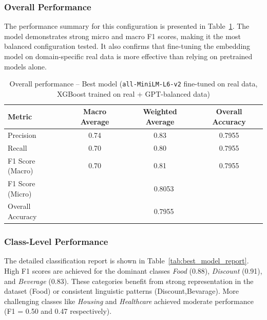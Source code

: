 \documentclass{SGGW-thesis-EN}
\begin{document}
\subsubsection*{Overall Performance}

The performance summary for this configuration is presented in Table~\ref{tab:best_model_summary}. The model demonstrates strong micro and macro  
F1 scores, making it the most balanced configuration tested. It also confirms that fine-tuning the embedding model on domain-specific real data  
is more effective than relying on pretrained models alone.

\begin{table}[h!]
  \centering
  \caption{Overall performance – Best model (\texttt{all-MiniLM-L6-v2} fine-tuned on real data, XGBoost trained on real + GPT-balanced data)}
  \label{tab:best_model_summary}
  \begin{tabularx}{\textwidth}{lccc}
    \toprule
    \textbf{Metric}         & \textbf{Macro Average} & \textbf{Weighted Average} & \textbf{Overall Accuracy} \\
    \midrule
    Precision               & 0.74                   & 0.83                      & 0.7955 \\
    Recall                  & 0.70                   & 0.80                      & 0.7955 \\
    F1 Score (Macro)        & 0.70                   & 0.81                      & 0.7955 \\
    F1 Score (Micro)        & \multicolumn{3}{c}{0.8053} \\
    Overall Accuracy  & \multicolumn{3}{c}{0.7955} \\
    \bottomrule
  \end{tabularx}
\end{table}

\subsubsection*{Class-Level Performance}

The detailed classification report is shown in Table~\ref{tab:best_model_report}. High F1 scores are achieved for the dominant classes  
\emph{Food} (0.88), \emph{Discount} (0.91), and \emph{Beverage} (0.83). These categories benefit from strong representation in the dataset (Food)
or consistent linguistic patterns (Discount,Bevarage). More challenging classes like \emph{Housing} and \emph{Healthcare} achieved moderate performance (F1 = 0.50  
and 0.47 respectively).
\end{document}

